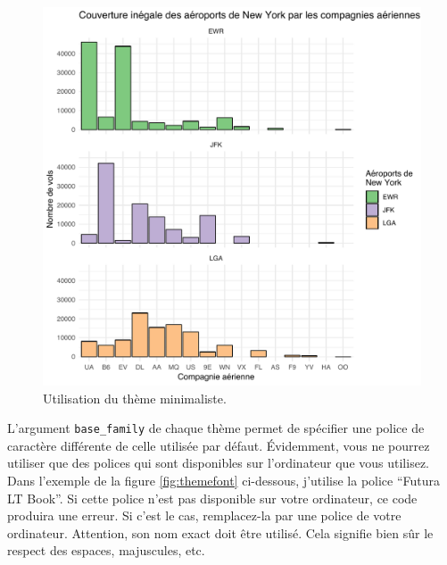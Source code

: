 \documentclass[a4paperpaper,]{article}
\theoremstyle{definition}
\theoremstyle{definition}
\theoremstyle{definition}
\theoremstyle{remark}
\begin{document}
\begin{figure}[htpb]

{\centering \includegraphics[width=0.9\linewidth]{figure/thememinimal-1} 

}

\caption{Utilisation du thème minimaliste.}\label{fig:thememinimal}
\end{figure}

L'argument \texttt{base\_family} de chaque thème permet de spécifier une
police de caractère différente de celle utilisée par défaut. Évidemment,
vous ne pourrez utiliser que des polices qui sont disponibles sur
l'ordinateur que vous utilisez. Dans l'exemple de la figure
\ref{fig:themefont} ci-dessous, j'utilise la police ``Futura LT Book''.
Si cette police n'est pas disponible sur votre ordinateur, ce code
produira une erreur. Si c'est le cas, remplacez-la par une police de
votre ordinateur. Attention, son nom exact doit être utilisé. Cela
signifie bien sûr le respect des espaces, majuscules, etc.
\end{document}
